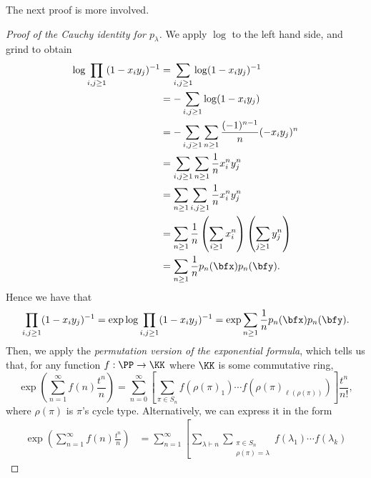 \documentclass{article}
\begin{document}
The next proof is more involved.

\begin{proof}
    [Proof of the Cauchy identity for $p_\lambda$]
    We apply $\log$ to the left hand side, and grind to obtain
    \begin{align*}
        \log \prod_{i,j \geq 1}
        (1-x_iy_j)^{-1}
        &=
        \sum_{i,j\geq1}
        \log(1-x_iy_j)^{-1} \\
        &=
        -\sum_{i,j \geq 1}
        \log(1-x_iy_j) \\
        &=
        -\sum_{i,j \geq 1}
        \sum_{n\geq 1}
        \frac{(-1)^{n-1}}{n}(-x_iy_j)^n \\
        &=
        \sum_{i,j \geq 1}
        \sum_{n\geq 1}
        \frac{1}{n} x_i^ny_j^n \\
        &=
        \sum_{n \geq 1}
        \sum_{i,j\geq 1}
        \frac{1}{n} x_i^ny_j^n \\
        &=
        \sum_{n \geq 1}
        \frac{1}{n}
        \left(\sum_{i\geq1}x_i^n\right)
        \left(\sum_{j\geq1}y_j^n\right) \\
        &=
        \sum_{n \geq 1}
        \frac{1}{n} p_n(\bfx) p_n(\bfy).
    \end{align*}
    Hence we have that
    \[
        \prod_{i,j\geq1}(1-x_iy_j)^{-1} 
        = 
        \exp \log \prod_{i,j\geq1}(1-x_iy_j)^{-1} 
        = 
        \exp \sum_{n \geq 1} 
        \frac{1}{n} p_n(\bfx) p_n(\bfy).
    \]
    Then, we apply the \textit{permutation version of the exponential formula}, which tells us that, for any function $f: \PP \to \KK$ where $\KK$ is some commutative ring,
    \[
        \exp
        \left(
            \sum_{n=1}^\infty
            f(n)
            \frac{t^n}{n}
        \right)
        =
        \sum_{n=0}^\infty
        \left[
            \sum_{
                \pi \in S_n
            }
            f(\rho(\pi)_1) \cdots f(\rho(\pi)_{\ell(\rho(\pi))})
        \right]
        \frac{t^n}{n!},
    \]
    where $\rho(\pi)$ is $\pi$'s cycle type.
    Alternatively, we can express it in the form
    \begin{align*}
        \exp
        \left(
            \sum_{n=1}^\infty
            f(n)
            \frac{t^n}{n}
        \right)
        &=
        \sum_{n=1}^\infty
        \left[
            \sum_{\lambda \vdash n}
            \sum_{
                \substack{
                \pi \in S_n \\
                \rho(\pi) = \lambda
                }
            }
            f(\lambda_1) \cdots f(\lambda_k)

\end{align*}
\end{proof}
\end{document}

